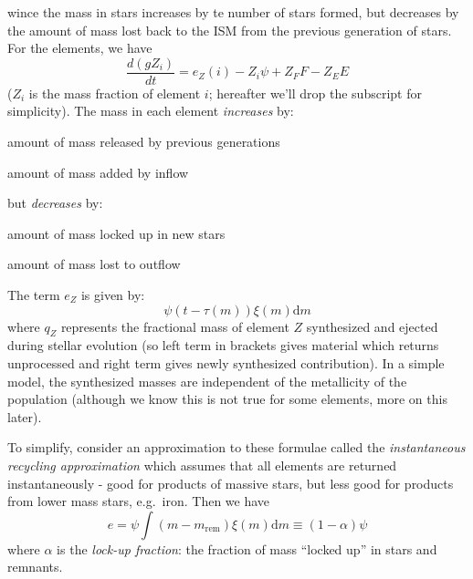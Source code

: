 \documentclass[12pt]{article}
\begin{document}
\begin{itemize*}
\begin{itemize*}
                wince the mass in stars increases by te number of stars formed,
                but decreases by the amount of mass lost back to the ISM from
                the previous generation of stars. For the elements, we have
                $$ \frac{d(gZ_i)}{dt} = e_Z(i) - Z_i\psi + Z_FF - Z_EE  $$
                ($Z_i$ is the mass fraction of element $i$; hereafter we'll drop
                the subscript for simplicity). The mass in each element
                \emph{increases} by:
                \begin{itemize*}
                    \item amount of mass released by previous generations
                    \item amount of mass added by inflow
                \end{itemize*}
                but \emph{decreases} by:
                \begin{itemize*}
                    \item amount of mass locked up in new stars
                    \item amount of mass lost to outflow
                \end{itemize*}
                The term $e_Z$ is given by:
                $$
                    \psi(t-\tau(m))\xi(m)\textrm{d}m
                $$
                where $q_Z$ represents the fractional mass of element $Z$
                synthesized and ejected during stellar evolution (so left term
                in brackets gives material which returns unprocessed and right
                term gives newly synthesized contribution).
                In a simple model, the synthesized masses are independent of
                the metallicity of the population (although we know this is not
                true for some elements, more on this later).
            \item To simplify, consider an approximation to these formulae called
                the \emph{instantaneous recycling approximation} which assumes
                that all elements are returned instantaneously - good for products
                of massive stars, but less good for products from lower mass stars,
                e.g.\ iron. Then we have
                $$ e = \psi\int(m-m_{\textrm{rem}})\xi(m)\textrm{d}m
                \equiv (1-\alpha)\psi $$
                where $\alpha$ is the \emph{lock-up fraction}: the fraction
                of mass ``locked up'' in stars and remnants.

\end{itemize*}
\end{itemize*}
\end{document}
